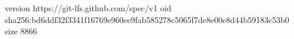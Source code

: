 version https://git-lfs.github.com/spec/v1
oid sha256:bd6ddf32f3341f16769e960ee9fab585278c5065f7de8e00e8d44b59183c53b0
size 8866
